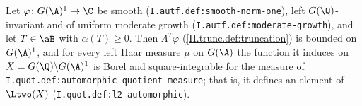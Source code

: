 Let $\varphi\colon G(\A)^1\to\C$ be smooth (\texttt{I.autf.def:smooth-norm-one}), left $G(\Q)$-invariant and of uniform moderate growth (\texttt{I.autf.def:moderate-growth}),
and let $T\in\aB$ with $\alpha(T)\ge0$. Then $\Lambda^T\varphi$ (\cref{II.trunc.def:truncation}) is bounded on $G(\A)^1$, and for every left Haar measure $\mu$ on $G(\A)$ the
function it induces on $X=G(\Q)\backslash G(\A)^1$ is Borel and square-integrable for the measure of \texttt{I.quot.def:automorphic-quotient-measure}; that is, it defines an
element of $\Ltwo(X)$ (\texttt{I.quot.def:l2-automorphic}).
